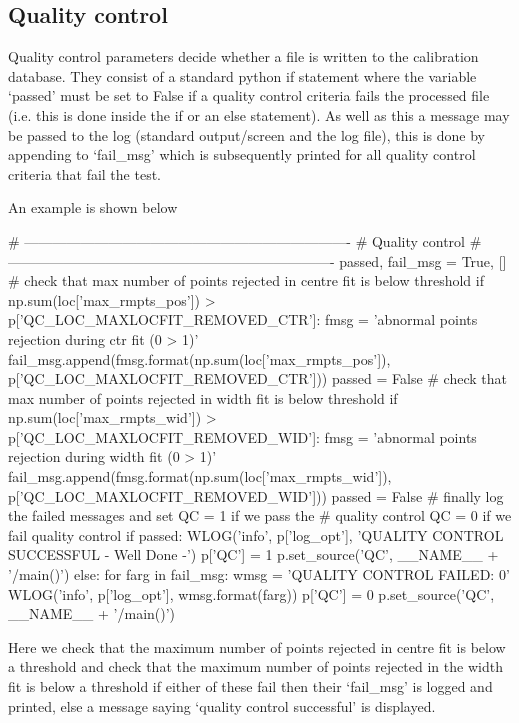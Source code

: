 \clearpage
\newpage
\subsection{Quality control}
\label{ch:the_recipes:gen_layout:gen_qc}

Quality control parameters decide whether a file is written to the calibration database. They consist of a standard python if statement where the variable `passed' must be set to False if a quality control criteria fails the processed file (i.e. this is done inside the if or an else statement). As well as this a message may be passed to the log (standard output/screen and the log file), this is done by appending to `fail\_msg' which is subsequently printed for all quality control criteria that fail the test.

\vspace{0.5cm}
\begin{minipage}{\textwidth}
\noindent An example is shown below
\begin{pythonbox}
# ----------------------------------------------------------------------
# Quality control
# ----------------------------------------------------------------------
passed, fail_msg = True, []
# check that max number of points rejected in centre fit is below threshold
if np.sum(loc['max_rmpts_pos']) > p['QC_LOC_MAXLOCFIT_REMOVED_CTR']:
    fmsg = 'abnormal points rejection during ctr fit ({0} > {1})'
    fail_msg.append(fmsg.format(np.sum(loc['max_rmpts_pos']),
                                p['QC_LOC_MAXLOCFIT_REMOVED_CTR']))
    passed = False
# check that max number of points rejected in width fit is below threshold
if np.sum(loc['max_rmpts_wid']) > p['QC_LOC_MAXLOCFIT_REMOVED_WID']:
    fmsg = 'abnormal points rejection during width fit ({0} > {1})'
    fail_msg.append(fmsg.format(np.sum(loc['max_rmpts_wid']),
                                p['QC_LOC_MAXLOCFIT_REMOVED_WID']))
    passed = False
# finally log the failed messages and set QC = 1 if we pass the
# quality control QC = 0 if we fail quality control
if passed:
    WLOG('info', p['log_opt'], 'QUALITY CONTROL SUCCESSFUL - Well Done -')
    p['QC'] = 1
    p.set_source('QC', __NAME__ + '/main()')
else:
    for farg in fail_msg:
        wmsg = 'QUALITY CONTROL FAILED: {0}'
        WLOG('info', p['log_opt'], wmsg.format(farg))
    p['QC'] = 0
    p.set_source('QC', __NAME__ + '/main()')
\end{pythonbox}
\begin{note}
Here we check that the maximum number of points rejected in centre fit is below a threshold and check that the maximum number of points rejected in the width fit is below a threshold if either of these fail then their `fail\_msg' is logged and printed, else a message saying `quality control successful' is displayed.
\end{note}
\end{minipage}

